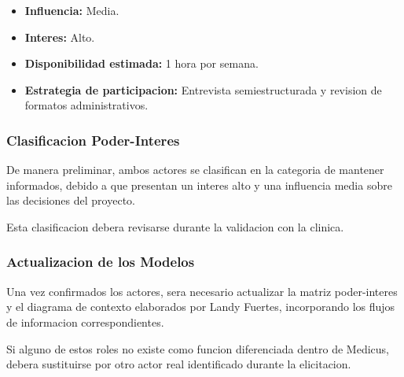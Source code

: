 \begin{itemize}
    \item \textbf{Influencia:} Media.
    \item \textbf{Interes:} Alto.
    \item \textbf{Disponibilidad estimada:}
    1 hora por semana.
    \item \textbf{Estrategia de participacion:}
    Entrevista semiestructurada y revision
    de formatos administrativos.
\end{itemize}

\subsubsection{Clasificacion Poder-Interes}

De manera preliminar, ambos actores se
clasifican en la categoria de mantener
informados, debido a que presentan un
interes alto y una influencia media
sobre las decisiones del proyecto.

Esta clasificacion debera revisarse
durante la validacion con la clinica.

\subsubsection{Actualizacion de los Modelos}

Una vez confirmados los actores, sera
necesario actualizar la matriz poder-interes
y el diagrama de contexto elaborados por
Landy Fuertes, incorporando los flujos
de informacion correspondientes.

Si alguno de estos roles no existe como
funcion diferenciada dentro de Medicus,
debera sustituirse por otro actor real
identificado durante la elicitacion.

